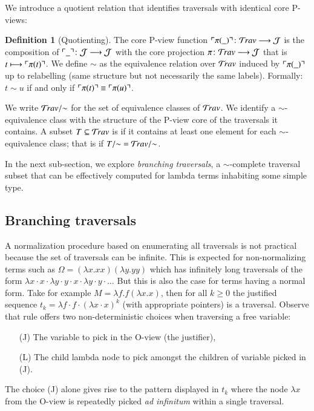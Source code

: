 \documentclass{elsarticle}
\theoremstyle{plain}
\theoremstyle{definition}
\newtheorem{definition}{Definition}[section]
\theoremstyle{remark}
\newcommand{\travulc}{\travset}
\def\coresymbol{\pi} %
\newcommand{\core}[1]{\coresymbol(#1)} %
\def\justseqset{\mathcal{J}}
\begin{document}
We introduce a quotient relation that identifies traversals with identical core P-views:
\begin{definition}[Quotienting]
The core P-view function
$\pview{\core{\_}} \colon \travulc \longrightarrow \justseqset $
is the composition of $\pview{\_}\colon \justseqset \longrightarrow \justseqset$ with the core projection $\coresymbol\colon\travulc  \longrightarrow \justseqset$ that is $t \longmapsto \pview{\core{t}}$.
We define $\sim$ as the equivalence relation over $\travulc$ induced by $\pview{\core{\_}}$ up to relabelling (same structure but not necessarily the same labels). Formally: $t \sim u$ if and only if $\pview{\core{t}} \equiv \pview{\core{u}}$.

We write $\travulc/{\sim}$ for the set of equivalence classes of $\travulc$. We identify a $\sim$-equivalence class with the structure of the P-view core of the traversals it contains. A subset $T\subseteq \travulc$ is  if it contains at least one element for each $\sim$-equivalence class; that is if $T/{\sim} = \travulc/{\sim}$.
\end{definition}

In the next sub-section, we explore
\emph{branching traversals}, a $\sim$-complete traversal subset that can be effectively computed for lambda terms inhabiting some simple type.

\subsection{Branching traversals}

A normalization procedure based on enumerating all traversals is not practical because the set of traversals can be infinite. This is expected for non-normalizing terms such as $\Omega = (\lambda x. x x)(\lambda y. y y)$ which has infinitely long traversals of the form $\lambda x \cdot x \cdot \lambda y \cdot y \cdot x \cdot \lambda y \cdot y \cdot \ldots$ But this is also the case for terms having a normal form. Take for example $M = \lambda f . f (\lambda x. x)$, then for all $k\geq0$ the justified sequence $t_k = \lambda f \cdot f \cdot (\lambda x \cdot  x)^k$ (with appropriate pointers) is a traversal.
Observe that rule  offers two non-deterministic choices when traversing a free variable:
\begin{itemize}
\item[(J)] The variable to pick in the O-view (the justifier),
\item[(L)] The child lambda node to pick amongst the children of variable picked in (J).
\end{itemize}
The choice (J) alone gives rise to the pattern displayed in $t_k$ where the node $\lambda x$ from the O-view is repeatedly picked {\it ad infinitum} within a single traversal.
\end{document}
